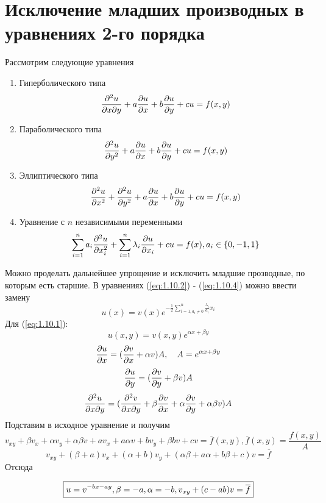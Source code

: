 \documentclass[../main.tex]{subfiles}
\begin{document}
\section{Исключение младших производных в уравнениях 2-го порядка}
Рассмотрим следующие уравнения
{\bf
\begin{enumerate}
	\item Гиперболического типа
	      \begin{equation} \label{eq:1.10.1}
			\frac{\partial ^2 u}{\partial x \partial y} + a \frac{\partial u}{\partial x} + b \frac{\partial u}{\partial y} + cu = f(x, y)
	      \end{equation}
	\item Параболического типа
	      \begin{equation} \label{eq:1.10.2}
			\frac{\partial ^2 u}{\partial y^2} + a \frac{\partial u}{\partial x} + b \frac{\partial u}{\partial y} + cu = f(x, y)
	      \end{equation}
	\item Эллиптического типа
	      \begin{equation} \label{eq:1.10.3}
		      \frac{\partial ^2 u}{\partial x^2} + \frac{\partial^2 u}{\partial y^2} + a \frac{\partial u}{\partial x} + b \frac{\partial u}{\partial y} + cu = f(x, y)
	      \end{equation}
	\item Уравнение с $n$ независимыми переменными
	      \begin{equation} \label{eq:1.10.4}
		      \sum_{i=1}^n a_i \frac{\partial^2 u }{\partial x_i^2} + \sum_{i=1}^n \lambda_i \frac{\partial u}{\partial x_i} + cu = f(x), a_i \in \{0, -1, 1\}
	      \end{equation}
\end{enumerate}}
Можно проделать дальнейшее упрощение и исключить младшие прозводные, по которым есть старшие.
В уравнениях (\ref{eq:1.10.2}) - (\ref{eq:1.10.4}) можно ввести замену
$$u(x) = v(x)e^{-\frac{1}{2} \sum \limits_{i=1, a_i \neq 0}^n \frac{\lambda_i}{a_i} x_i}$$
Для (\ref{eq:1.10.1}):
$$u(x,y) = v(x,y) e ^ {\alpha x + \beta y}$$
$$\frac{\partial u}{\partial x} = (\frac{\partial v}{\partial x}+\alpha v)A, \quad A=e ^ {\alpha x + \beta y}$$
$$\frac{\partial u}{\partial y} = (\frac{\partial v}{\partial y}+\beta v)A$$
$$\frac{\partial^2 u}{\partial x \partial y} = (\frac{\partial^2 v}{\partial x \partial y} + \beta \frac{\partial v}{\partial x} + \alpha \frac{\partial v}{\partial y} + \alpha \beta v)A$$
Подставим в исходное уравнение и получим
$$v_{xy} + \beta v_x + \alpha v_y + \alpha \beta v + a v_x + a \alpha v + b v_y + \beta b v + cv = \overline{f}(x,y), \overline{f}(x,y) = \frac{f(x,y)}{A}$$
$$v_{xy} + (\beta + a)v_x + (\alpha + b)v_y + (\alpha \beta + a \alpha + b \beta + c)v = \overline{f}$$
Отсюда

\begin{equation*}
	\boxed{
		u = v^{-bx - ay}, \\
		\beta = -a, \alpha = -b,\\
		v_{xy} + (c-ab)v = \overline{f}
	}
\end{equation*}
\end{document}
